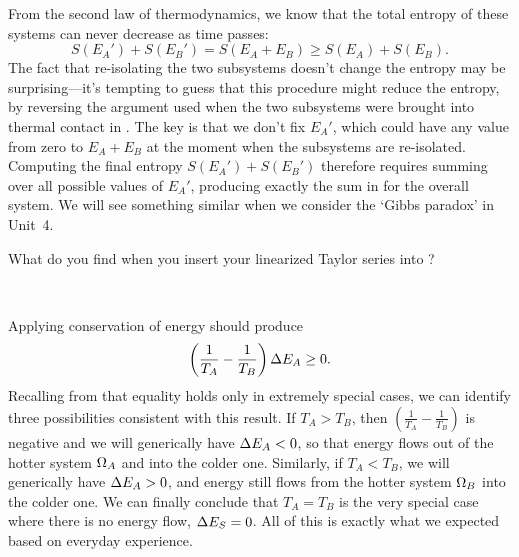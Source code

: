 From the second law of thermodynamics, we know that the total entropy of these systems can never decrease as time passes:
\begin{equation}
  \label{eq:entropy_ineq}
  S(E_A') + S(E_B') = S(E_A + E_B) \geq S(E_A) + S(E_B).
\end{equation}
The fact that re-isolating the two subsystems doesn't change the entropy may be surprising---it's tempting to guess that this procedure might reduce the entropy, by reversing the argument used when the two subsystems were brought into thermal contact in .
The key is that we don't fix $E_A'$, which could have any value from zero to $E_A + E_B$ at the moment when the subsystems are re-isolated.
Computing the final entropy $S(E_A') + S(E_B')$ therefore requires summing over all possible values of $E_A'$, producing exactly the sum in  for the overall system.
We will see something similar when we consider the `Gibbs paradox' in Unit~4.

\newpage %
What do you find when you insert your linearized Taylor series into ?
\begin{mdframed}
  \ \\[100 pt]
\end{mdframed}
Applying conservation of energy should produce
\begin{equation*}
  \left(\frac{1}{T_A} - \frac{1}{T_B}\right) \Delta E_A \geq 0.
\end{equation*}
Recalling from  that equality holds only in extremely special cases, we can identify three possibilities consistent with this result.
If $T_A > T_B$, then $\left(\frac{1}{T_A} - \frac{1}{T_B}\right)$ is negative and we will generically have $\Delta E_A < 0$, so that energy flows out of the hotter system $\Omega_A$ and into the colder one.
Similarly, if $T_A < T_B$, we will generically have $\Delta E_A > 0$, and energy still flows from the hotter system $\Omega_B$ into the colder one.
We can finally conclude that $T_A = T_B$ is the very special case where there is no energy flow, $\Delta E_S = 0$.
All of this is exactly what we expected based on everyday experience.
